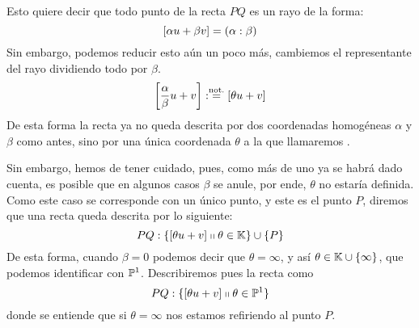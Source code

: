 Esto quiere decir que todo punto de la recta $PQ$ es un rayo de la forma: \[\left [ \alpha u+\beta v \right ]=(\alpha:\beta)\]
Sin embargo, podemos reducir esto aún un poco más, cambiemos el representante del rayo dividiendo todo por $\beta$.
\[\left [ \frac{\alpha}{\beta}u+v \right ]:\stackrel{\textrm{not.}}{=}\left [ \theta u+v \right ]\]
De esta forma la recta ya no queda descrita por dos coordenadas homogéneas $\alpha$ y $\beta$ como antes, sino por una única coordenada $\theta$ a la que llamaremos .
	
Sin embargo, hemos de tener cuidado, pues, como más de uno ya se habrá dado cuenta, es posible que en algunos casos $\beta$ se anule, por ende, $\theta$ no estaría definida. Como este caso se corresponde con un único punto, y este es el punto $P$, diremos que una recta queda descrita por lo siguiente:
\begin{equation}
	\label{C3_eq_descripcionRecta}
	PQ:\{\left [ \theta u+v \right ]\shortparallel \theta\in\mathbb{K}\}\cup\{P\}
\end{equation}
De esta forma, cuando $\beta=0$ podemos decir que $\theta=\infty$, y así $\theta\in\mathbb{K}\cup \{\infty\}$, que podemos identificar con $\mathbb{P}^1$. Describiremos pues la recta como
\begin{equation}
	\label{C3_eq_descripcionRectaP1}
	PQ:\{\left [ \theta u+v \right ]\shortparallel \theta\in\mathbb{P}^1\}
\end{equation}
donde se entiende que si $\theta=\infty$ nos estamos refiriendo al punto $P$. 

